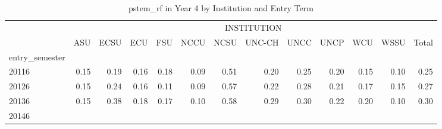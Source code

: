 \begin{table}[!h]
\caption{pstem\_rf in Year 4 by Institution and Entry Term}
\centering
\begin{tabular}{lllllllllllll}
\cline{1-13}
\multicolumn{1}{c}{} &
  \multicolumn{12}{|c}{INSTITUTION} \\
\multicolumn{1}{c}{} &
  \multicolumn{1}{|r}{ASU} &
  \multicolumn{1}{r}{ECSU} &
  \multicolumn{1}{r}{ECU} &
  \multicolumn{1}{r}{FSU} &
  \multicolumn{1}{r}{NCCU} &
  \multicolumn{1}{r}{NCSU} &
  \multicolumn{1}{r}{UNC-CH} &
  \multicolumn{1}{r}{UNCC} &
  \multicolumn{1}{r}{UNCP} &
  \multicolumn{1}{r}{WCU} &
  \multicolumn{1}{r}{WSSU} &
  \multicolumn{1}{r}{Total} \\
\cline{1-13}
\multicolumn{1}{l}{entry\_semester} &
  \multicolumn{1}{|r}{} &
  \multicolumn{1}{r}{} &
  \multicolumn{1}{r}{} &
  \multicolumn{1}{r}{} &
  \multicolumn{1}{r}{} &
  \multicolumn{1}{r}{} &
  \multicolumn{1}{r}{} &
  \multicolumn{1}{r}{} &
  \multicolumn{1}{r}{} &
  \multicolumn{1}{r}{} &
  \multicolumn{1}{r}{} &
  \multicolumn{1}{r}{} \\
\multicolumn{1}{l}{\hspace{1em}20116} &
  \multicolumn{1}{|r}{0.15} &
  \multicolumn{1}{r}{0.19} &
  \multicolumn{1}{r}{0.16} &
  \multicolumn{1}{r}{0.18} &
  \multicolumn{1}{r}{0.09} &
  \multicolumn{1}{r}{0.51} &
  \multicolumn{1}{r}{0.20} &
  \multicolumn{1}{r}{0.25} &
  \multicolumn{1}{r}{0.20} &
  \multicolumn{1}{r}{0.15} &
  \multicolumn{1}{r}{0.10} &
  \multicolumn{1}{r}{0.25} \\
\multicolumn{1}{l}{\hspace{1em}20126} &
  \multicolumn{1}{|r}{0.15} &
  \multicolumn{1}{r}{0.24} &
  \multicolumn{1}{r}{0.16} &
  \multicolumn{1}{r}{0.11} &
  \multicolumn{1}{r}{0.09} &
  \multicolumn{1}{r}{0.57} &
  \multicolumn{1}{r}{0.22} &
  \multicolumn{1}{r}{0.28} &
  \multicolumn{1}{r}{0.21} &
  \multicolumn{1}{r}{0.17} &
  \multicolumn{1}{r}{0.15} &
  \multicolumn{1}{r}{0.27} \\
\multicolumn{1}{l}{\hspace{1em}20136} &
  \multicolumn{1}{|r}{0.15} &
  \multicolumn{1}{r}{0.38} &
  \multicolumn{1}{r}{0.18} &
  \multicolumn{1}{r}{0.17} &
  \multicolumn{1}{r}{0.10} &
  \multicolumn{1}{r}{0.58} &
  \multicolumn{1}{r}{0.29} &
  \multicolumn{1}{r}{0.30} &
  \multicolumn{1}{r}{0.22} &
  \multicolumn{1}{r}{0.20} &
  \multicolumn{1}{r}{0.10} &
  \multicolumn{1}{r}{0.30} \\
\multicolumn{1}{l}{\hspace{1em}20146} &

\end{tabular}
\end{table}
